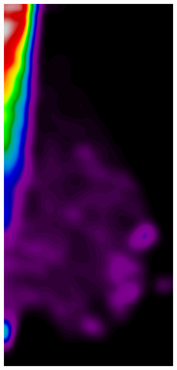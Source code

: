 \documentclass{beamer}
\begin{document}
\begin{frame}
\begin{figure}
\begin{subfigure}{0.134\textwidth}
            \end{subfigure}
            \begin{subfigure}{0.134\textwidth}
	            \centering
		            \includegraphics[width=\textwidth]{plots/examples/example1_probs_1_1.png}

\end{subfigure}
\end{figure}
\end{frame}
\end{document}
